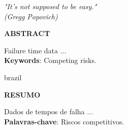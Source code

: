 \documentclass[12pt, %
               openright, %
               oneside, %
               a4paper, %
               chapter=TITLE, %
               section=TITLE, %
               brazil,
               english %
]{abntex2}
\begin{document}
\begin{epigrafe}
  \vspace*{\fill}
  \begin{flushright}
    \textit{"It's not supposed to be easy."\\
             (Gregg Popovich)}
  \end{flushright}
\end{epigrafe}
\newpage
\setlength{\absparsep}{18pt} %
\setlength{\abstitleskip}{1cm} %
\begin{resumo}[]
  \vspace{-2cm}
  \begin{center}
    \bfseries{\large{\textsf{ABSTRACT}}}
  \end{center}
  \vspace{0.3cm}
  Failure time data \(\dots\)\\

  \textbf{Keywords}: Competing risks.
\end{resumo}
\newpage
\setlength{\absparsep}{18pt} %
\setlength{\abstitleskip}{1cm} %
\begin{resumo}[]
  \begin{otherlanguage*}{brazil}
    \vspace{-2cm}
    \begin{center}
      \bfseries{\large{\textsf{RESUMO}}}
    \end{center}
    \vspace{0.3cm}
    Dados de tempos de falha \(\dots\)\\

    \textbf{Palavras-chave}: Riscos competitivos.
  \end{otherlanguage*}
\end{resumo}
\listoffigures*
\cleardoublepage
\end{document}
